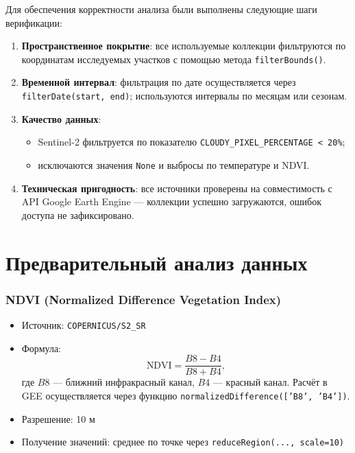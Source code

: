 Для обеспечения корректности анализа были выполнены следующие шаги верификации:

\begin{enumerate}
	\item \textbf{Пространственное покрытие}: все используемые коллекции фильтруются по координатам исследуемых участков с помощью метода \texttt{filterBounds()}.
	
	\item \textbf{Временной интервал}: фильтрация по дате осуществляется через \texttt{filterDate(start, end)}; используются интервалы по месяцам или сезонам.
	
	\item \textbf{Качество данных}:
	\begin{itemize}
		\item Sentinel-2 фильтруется по показателю \texttt{CLOUDY\_PIXEL\_PERCENTAGE < 20\%};
		\item исключаются значения \texttt{None} и выбросы по температуре и NDVI.
	\end{itemize}
	
	\item \textbf{Техническая пригодность}: все источники проверены на совместимость с API Google Earth Engine — коллекции успешно загружаются, ошибок доступа не зафиксировано.
\end{enumerate}

\section{Предварительный анализ данных}

\subsubsection*{NDVI (Normalized Difference Vegetation Index) \cite{Cherepanov2011}}

\begin{itemize}
	\item Источник: \texttt{COPERNICUS/S2\_SR}
	\item Формула:
	\[
	\text{NDVI} = \frac{B8 - B4}{B8 + B4},
	\]
	где $B8$ — ближний инфракрасный канал, $B4$ — красный канал. Расчёт в GEE осуществляется через функцию \texttt{normalizedDifference(['B8', 'B4'])}.
	\item Разрешение: 10 м
	\item Получение значений: среднее по точке через \texttt{reduceRegion(..., scale=10)}
\end{itemize}

